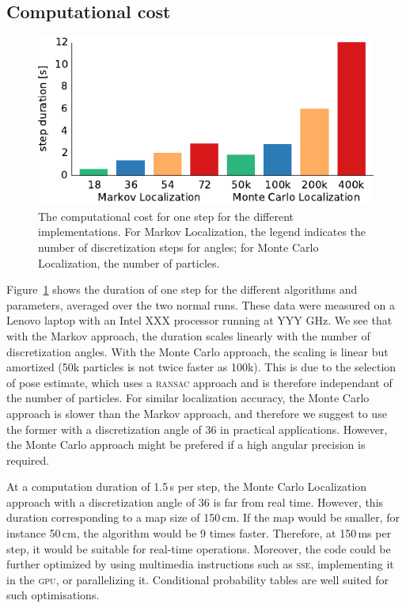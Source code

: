 \documentclass[letterpaper, 10pt, conference]{ieeeconf}
\newcommand{\Fig}[1]{Figure~\ref{fig:#1}}
\begin{document}
\subsection{Computational cost}

\begin{figure}
\includegraphics{cpu_load}
\caption{The computational cost for one step for the different implementations.
For Markov Localization, the legend indicates the number of discretization steps for angles; for Monte Carlo Localization, the number of particles.}
\label{fig:cpuload}
\end{figure}

\Fig{cpuload} shows the duration of one step for the different algorithms and parameters, averaged over the two normal runs.
These data were measured on a Lenovo laptop with an Intel XXX processor running at YYY GHz.
We see that with the Markov approach, the duration scales linearly with the number of discretization angles.
With the Monte Carlo approach, the scaling is linear but amortized (50k particles is not twice faster as 100k).
This is due to the selection of pose estimate, which uses a \textsc{ransac} approach and is therefore independant of the number of particles.
For similar localization accuracy, the Monte Carlo approach is slower than the Markov approach, and therefore we suggest to use the former with a discretization angle of 36 in practical applications.
However, the Monte Carlo approach might be prefered if a high angular precision is required.

At a computation duration of 1.5\,s per step, the Monte Carlo Localization approach with a discretization angle of 36 is far from real time.
However, this duration corresponding to a map size of 150\,cm.
If the map would be smaller, for instance 50\,cm, the algorithm would be 9 times faster.
Therefore, at 150\,ms per step, it would be suitable for real-time operations.
Moreover, the code could be further optimized by using multimedia instructions such as \textsc{sse}, implementing it in the \textsc{gpu}, or parallelizing it.
Conditional probability tables are well suited for such optimisations.
\end{document}
